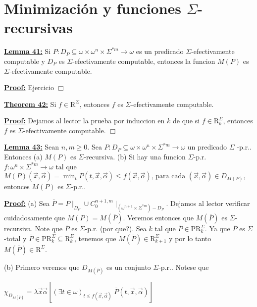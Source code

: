 \section{Minimización y funciones $\Sigma$-recursivas}

\textbf{\underline{Lemma 41:}} Si \(P:D_{P}\subseteq \omega \times \omega ^{n}\times \Sigma ^{\ast m}\rightarrow \omega \) es un predicado \(\Sigma \)-efectivamente computable y \( D_{P}\) es \(\Sigma \)-efectivamente computable, entonces la funcion \(M(P)\) es \( \Sigma \)-efectivamente computable.

\textbf{\underline{Proof:}} Ejercicio \(\Box\)

\textbf{\underline{Theorem 42:}} Si \(f\in \mathrm{R} ^{\Sigma }\), entonces \(f\) es \(\Sigma \)-efectivamente computable.

\textbf{\underline{Proof:}} Dejamos al lector la prueba por induccion en \(k\) de que si \(f\in \mathrm{R} _{k}^{\Sigma }\), entonces \(f\) es \(\Sigma \)-efectivamente computable. \(\Box\)

\textbf{\underline{Lemma 43:}} Sean \(n,m\geq 0\). Sea \(P:D_{P}\subseteq \omega \times \omega ^{n}\times \Sigma ^{\ast m}\rightarrow \omega \) un predicado \(\Sigma \) -p.r.. Entonces
(a) \(M(P)\) es \(\Sigma \)-recursiva.
(b) Si hay una funcion \(\Sigma \)-p.r. \(f:\omega ^{n}\times \Sigma ^{\ast m}\rightarrow \omega \) tal que
\(\displaystyle M(P)(\vec{x},\vec{\alpha})=\min_{t}P(t,\vec{x},\vec{\alpha})\leq f(\vec{x}, \vec{\alpha})\text{, para cada }(\vec{x},\vec{\alpha})\in D_{M(P)}\text{,} \)
entonces \(M(P)\) es \(\Sigma \)-p.r..

\textbf{\underline{Proof:}} (a) Sea \(\bar{P}=P\mid _{D_{P}}\cup C_{0}^{n+1,m}\mid _{(\omega ^{n+1}\times \Sigma ^{\ast m})-D_{P}}\). Dejamos al lector verificar cuidadosamente que \( M(P)=M(\bar{P})\). Veremos entonces que \(M(\bar{P})\) es \(\Sigma \)-recursiva. Note que \(\bar{P}\) es \(\Sigma \)-p.r. (por que?). Sea \(k\) tal que \(\bar{P}\in \mathrm{PR}_{k}^{\Sigma }\). Ya que \(\bar{P}\) es \(\Sigma \)-total y \(\bar{P} \in \mathrm{PR}_{k}^{\Sigma }\subseteq \mathrm{R}_{k}^{\Sigma }\), tenemos que \(M(\bar{P})\in \mathrm{R}_{k+1}^{\Sigma }\) y por lo tanto \(M(\bar{P})\in \mathrm{R}^{\Sigma }\).

(b) Primero veremos que \(D_{M(\bar{P})}\) es un conjunto \(\Sigma \)-p.r.. Notese que

\(\displaystyle \chi _{D_{M(\bar{P})}}=\lambda \vec{x}\vec{\alpha}\left[ (\exists t\in \omega )_{t\leq f(\vec{x},\vec{\alpha})}\;\bar{P}(t,\vec{x},\vec{\alpha}) \right] \)

